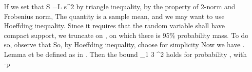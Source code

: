 If we set that
 {
\NC S
=\NC L s^2 \NR
}
by triangle inequality, by the property of 2-norm and Frobenius norm,
%
%
The quantity  is a sample mean, and we may want to use Hoeffding inequality.
Since it requires that the random variable shall have compact support, we truncate  on , on which there is 95\% probability mass.
%
To do so, observe that
%
So, by Hoeffding inequality, choose for simplicity
%
 {
\NC {} 
\leq {} \exp {} \NR
}
%
Now we have .
%
\Result
{Lemma}
{
et  be defined as in .
Then the bound
%
 {
\NC {} _1
\leq \NC {} {3} ^2 \NR
}
%
holds for probability , with
%
 {
 -p
\leq {} \exp {} \NR
}
}

\stopsubsection
\stopsection

